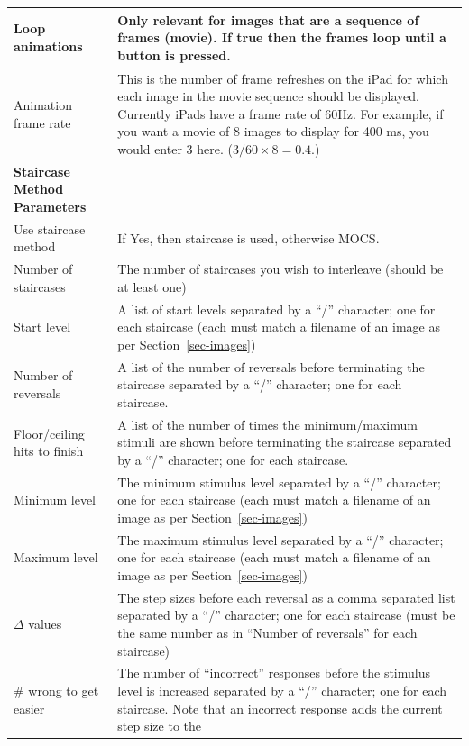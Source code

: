 \documentclass{article}
\begin{document}
\begin{longtable}{|p{5cm}|p{10cm}|}
\hline
Loop animations & Only relevant for images that are a sequence of frames (movie). If true then the frames loop until a button is pressed.\\
\hline
Animation frame rate & This is the number of frame refreshes on the iPad
for which each image in the movie sequence should be displayed.
Currently iPads have a frame rate of 60Hz.
For example, if you want a movie of 8 images to display for 400 ms, you
would enter 3 here. ($3/60\times 8 = 0.4$.)
\\
\hline
\hline
{\bf Staircase Method Parameters}  & \\\nopagebreak
Use staircase method & If Yes, then staircase is used, otherwise MOCS. \\
\hline
Number of staircases & The number of
staircases you wish to interleave (should be at least one) \\
\hline
Start level & A list of start levels separated by a ``/'' character; one for each staircase
            (each must match a filename of an image as per Section~\ref{sec-images}) \\
\hline
Number of reversals & A list of the number of reversals before terminating the staircase 
            separated by a ``/'' character; one for each staircase. \\
\hline
Floor/ceiling hits to finish & A list of the number of times the minimum/maximum stimuli are shown
            before terminating the staircase 
            separated by a ``/'' character; one for each staircase. \\
\hline
Minimum level & The minimum stimulus level 
            separated by a ``/'' character; one for each staircase
            (each must match a filename of an image as per Section~\ref{sec-images}) \\
\hline
Maximum level & The maximum stimulus level 
            separated by a ``/'' character; one for each staircase
            (each must match a filename of an image as per Section~\ref{sec-images}) \\
\hline
$\Delta$ values & The step sizes before each reversal as a comma separated list
            separated by a ``/'' character; one for each staircase
            (must be the same number as in ``Number of reversals'' for each staircase)\\
\hline
\# wrong to get easier & The number of ``incorrect'' responses before 
            the stimulus level is increased
            separated by a ``/'' character; one for each staircase. 
            Note
            that an incorrect response adds the current step size to the 

\end{longtable}
\end{document}
